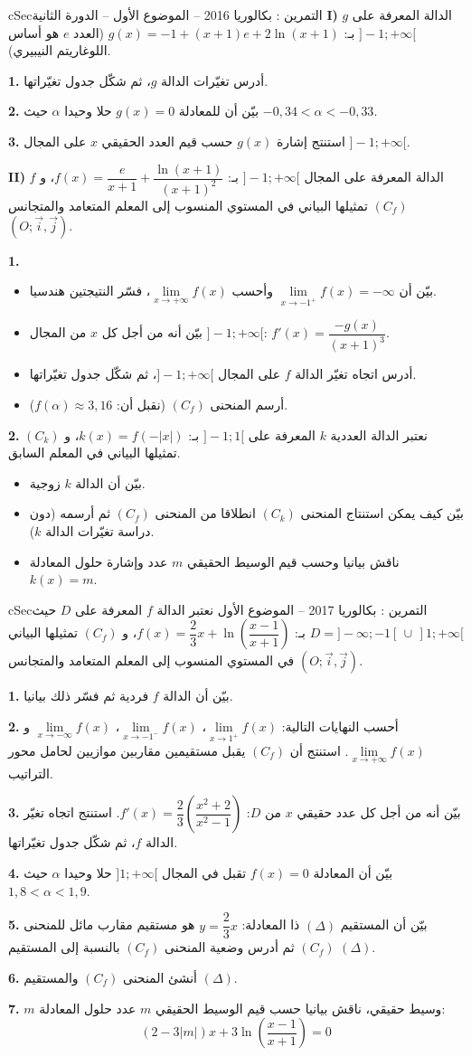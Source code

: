 \documentclass[12pt,a4paper]{article}
\newenvironment{BOX}[2]{\begin{otherlanguage}{english}\begin{arbox}{#1}{#2}}{\end{arbox}\end{otherlanguage}}
\newcounter{exo}
\newenvironment{tamrin}[1]{\stepcounter{exo}\begin{BOX}{cSec}{التمرين \theexo: #1}}{\end{BOX}}
\newenvironment{sq}{\begin{itemize}[leftmargin=2.4em,itemsep=3pt]}{\end{itemize}}
\newcommand{\qa}{\item[(أ)]}\newcommand{\qb}{\item[(ب)]}\newcommand{\qc}{\item[(جـ)]}\newcommand{\qd}{\item[(د)]}\newcommand{\qe}{\item[(هـ)]}
\newcommand{\QQ}[1]{\par\smallskip\textbf{#1.} }
\begin{document}
\begin{tamrin}{بكالوريا 2016 -- الموضوع الأول -- الدورة الثانية}
\textbf{I)} $g$ الدالة المعرفة على $]-1;+\infty[$ بـ: $g(x)=-1+(x+1)e+2\ln(x+1)$ (العدد $e$ هو أساس اللوغاريتم النيبيري).
\QQ{1} أدرس تغيّرات الدالة $g$، ثم شكّل جدول تغيّراتها.
\QQ{2} بيّن أن للمعادلة $g(x)=0$ حلا وحيدا $\alpha$ حيث $-0{,}34<\alpha<-0{,}33$.
\QQ{3} استنتج إشارة $g(x)$ حسب قيم العدد الحقيقي $x$ على المجال $]-1;+\infty[$.

\textbf{II)} $f$ الدالة المعرفة على المجال $]-1;+\infty[$ بـ: $f(x)=\dfrac{e}{x+1}+\dfrac{\ln(x+1)}{(x+1)^2}$،
و $(C_f)$ تمثيلها البياني في المستوي المنسوب إلى المعلم المتعامد والمتجانس $(O;\vec i,\vec j)$.
\QQ{1}
\begin{sq}
\qa بيّن أن $\lim\limits_{x\to -1^{+}}f(x)=-\infty$ وأحسب $\lim\limits_{x\to +\infty}f(x)$، فسّر النتيجتين هندسيا.
\qb بيّن أنه من أجل كل $x$ من المجال $]-1;+\infty[$: $f'(x)=\dfrac{-g(x)}{(x+1)^3}$.
\qc أدرس اتجاه تغيّر الدالة $f$ على المجال $]-1;+\infty[$، ثم شكّل جدول تغيّراتها.
\qd أرسم المنحنى $(C_f)$ (نقبل أن: $f(\alpha)\approx 3{,}16$).
\end{sq}
\QQ{2} نعتبر الدالة العددية $k$ المعرفة على $]-1;1[$ بـ: $k(x)=f(-|x|)$، و $(C_k)$ تمثيلها البياني في المعلم السابق.
\begin{sq}
\qa بيّن أن الدالة $k$ زوجية.
\qb بيّن كيف يمكن استنتاج المنحنى $(C_k)$ انطلاقا من المنحنى $(C_f)$ ثم أرسمه (دون دراسة تغيّرات الدالة $k$).
\qc ناقش بيانيا وحسب قيم الوسيط الحقيقي $m$ عدد وإشارة حلول المعادلة $k(x)=m$.
\end{sq}
\end{tamrin}

\begin{tamrin}{بكالوريا 2017 -- الموضوع الأول}
نعتبر الدالة $f$ المعرفة على $D$ حيث $D=]-\infty;-1[\,\cup\,]1;+\infty[$ بـ: $f(x)=\dfrac23x+\ln\left(\dfrac{x-1}{x+1}\right)$،
و $(C_f)$ تمثيلها البياني في المستوي المنسوب إلى المعلم المتعامد والمتجانس $(O;\vec i,\vec j)$.
\QQ{1} بيّن أن الدالة $f$ فردية ثم فسّر ذلك بيانيا.
\QQ{2} أحسب النهايات التالية: $\lim\limits_{x\to 1^{+}}f(x)$، $\lim\limits_{x\to -1^{-}}f(x)$، $\lim\limits_{x\to -\infty}f(x)$ و $\lim\limits_{x\to +\infty}f(x)$.
استنتج أن $(C_f)$ يقبل مستقيمين مقاربين موازيين لحامل محور التراتيب.
\QQ{3} بيّن أنه من أجل كل عدد حقيقي $x$ من $D$: $f'(x)=\dfrac23\left(\dfrac{x^2+2}{x^2-1}\right)$.
استنتج اتجاه تغيّر الدالة $f$، ثم شكّل جدول تغيّراتها.
\QQ{4} بيّن أن المعادلة $f(x)=0$ تقبل في المجال $]1;+\infty[$ حلا وحيدا $\alpha$ حيث $1{,}8<\alpha<1{,}9$.
\QQ{5} بيّن أن المستقيم $(\Delta)$ ذا المعادلة: $y=\dfrac23x$ هو مستقيم مقارب مائل للمنحنى $(C_f)$ ثم أدرس وضعية المنحنى $(C_f)$ بالنسبة إلى المستقيم $(\Delta)$.
\QQ{6} أنشئ المنحنى $(C_f)$ والمستقيم $(\Delta)$.
\QQ{7} $m$ وسيط حقيقي، ناقش بيانيا حسب قيم الوسيط الحقيقي $m$ عدد حلول المعادلة:
\[(2-3|m|)x+3\ln\left(\frac{x-1}{x+1}\right)=0\]
\end{tamrin}
\end{document}
